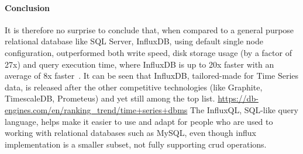 \paragraph{Conclusion}
It is therefore no surprise to conclude that, when compared to a general purpose relational database like SQL Server, InfluxDB, using default single node configuration, outperformed both write speed, disk storage usage (by a factor of 27x) and query execution time, where InfluxDB is up to 20x faster with an average of 8x faster~\cite{Misc:noor_2017_universit}.
It can be seen that InfluxDB, tailored-made for Time Series data, is released after the other competitive technologies (like Graphite, TimescaleDB, Prometeus) and yet still among the top list. \url{https://db-engines.com/en/ranking_trend/time+series+dbms}
The InfluxQL, SQL-like query language, helps make it easier to use and adapt for people who are used to working with relational databases such as MySQL, even though influx
implementation is a smaller subset, not fully supporting \ac{crud} operations.
